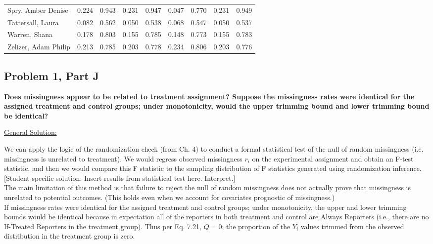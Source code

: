 \documentclass[11pt,notitlepage]{article}
\begin{document}
\begin{table}[h!]
\begin{center}
\begin{tabular}{lcc|cc|cc|cc}
  Spry, Amber Denise & 0.224 & 0.943 & 0.231 & 0.947 & 0.047 & 0.770 & 0.231 & 0.949 \\ 
  Tattersall, Laura & 0.082 & 0.562 & 0.050 & 0.538 & 0.068 & 0.547 & 0.050 & 0.537 \\ 
  Warren, Shana & 0.178 & 0.803 & 0.155 & 0.785 & 0.148 & 0.773 & 0.155 & 0.783 \\ 
  Zelizer, Adam Philip & 0.213 & 0.785 & 0.203 & 0.778 & 0.234 & 0.806 & 0.203 & 0.776 \\ 
   \hline
\end{tabular}
\end{center}
\end{table}


\clearpage


\subsection{Problem 1, Part J} {\bf Does missingness appear to be related to treatment assignment?  Suppose the missingness rates were identical for the assigned treatment and control groups; under monotonicity, would the upper trimming bound and lower trimming bound be identical?}

\vspace{1cm}

\underline{{\sc General Solution:}}

We can apply the logic of the randomization check (from Ch. 4) to conduct a formal statistical test of the null of random missingness (i.e. missingness is unrelated to treatment). We would regress observed missingness $r_i$ on the experimental assignment and obtain an F-test statistic, and then we would compare this F statistic to the sampling distribution of F statistics generated using randomization inference.\\

[Student-specific solution: Insert results from statistical test here. Interpret.]\\

The main limitation of this method is that failure to reject the null of random missingness does not actually prove that missingness is unrelated to potential outcomes. (This holds even when we account for covariates prognostic of missingness.)\\

If missingness rates were identical for the assigned treatment and control groups; under monotonicity, the upper and lower trimming bounds would be identical because in expectation all of the reporters in both treatment and control are Always Reporters (i.e., there are no If-Treated Reporters in the treatment group). Thus per Eq. 7.21, $Q = 0$; the proportion of the $Y_i$ values trimmed from the observed distribution in the treatment group is zero.
\end{document}
